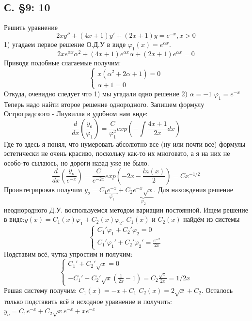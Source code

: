 \documentclass{article}
\begin{document}
\subsection{С. \S9: 10 }
Решить уравнение 
\begin{equation}
    2 x y'' + (4x+1)y' + (2x+1)y=e^{-x}, x>0
\end{equation}
1) угадаем первое решение О.Д.У в виде $\varphi_1(x)=e^{\alpha x}$.
\begin{equation}
    2x e^{\alpha x} \alpha^2 + (4x+1)e^{\alpha x}\alpha + (2x+1) e^{\alpha x}=0
\end{equation}
Приводя подобные слагаемые получим:
\begin{equation}
    \begin{cases}
    x(\alpha^2+2 \alpha +1)=0   \\
        \alpha +1 =0
    \end{cases}
\end{equation}
Откуда, очевидно следует что 1) мы угадали одно решение 2) $\alpha =-1$ \Rightarrow $\varphi_1=e^{-x}$
Теперь надо найти второе решение однородного. Запишем формулу Остроградского - Лиувилля в удобном нам виде:
\begin{equation}
    \frac{d}{dx} \left( \frac{y_o}{\varphi_1} \right)= \frac{C}{\varphi_1^2} exp \left( - \int \frac{4x+1} {2x}dx  \right) 
\end{equation}
\textcolor[rgb]{1,1,1}{Где-то здесь я понял, что нумеровать абсолютно все (ну или почти все) формулы эстетически не очень красиво, поскольку как-то их многовато, а я на них не особо-то сылаюсь, но дороги назад уже не было. }
\begin{equation}
    \frac{d}{dx} \left( \frac{y_o}{e^{-x}} \right)= \frac{C}{e^{-2x}} exp \left(-2x - \frac{ln(x)}{2}  \right) = C x^{-1/2}
\end{equation}
Проинтегрировав получим $y_o=C_1 \underbrace{e^{-x}}_{\varphi_1}+ C_2 \underbrace{e^{-x} \sqrt x}_{\varphi_2}$. 
Для нахождения решение неоднородного Д.У. воспользуемся методом вариации постоянной. 
Ищем решение в виде:$y(x)=C_1(x)\varphi_1 + C_2(x) \varphi_2$. $C_1(x)$ и $C_2(x)$ найдём из системы
\begin{equation}
    \begin{cases}
        C_1' \varphi_1+C_2'\varphi_2=0\\
        C_1' \varphi_1'+C_2'\varphi_2'=\frac{e^{-x}}{2x}
    \end{cases}
\end{equation}
Подставим всё, чутка упростим и получим:
\begin{equation}
    \begin{cases}
        C_1'+C_2' \sqrt x = 0\\
        -C_1'+C_2' \sqrt x (\frac{1}{2x}-1)=C_2 \frac{\sqrt x }{2x}=1/2x
    \end{cases}
\end{equation}
Решая систему получим: $C_1(x)= -x + C_1$ $C_2(x)=2 \sqrt x + C_2$. Осталось только подставить всё в исходное уравнение и получить: $y_o=C_1 e^{-x}+C_2\sqrt x e^{-x} + x e^{-x}$ 
\end{document}
